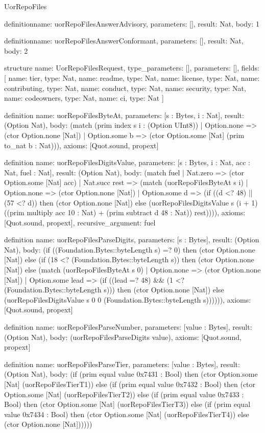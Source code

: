 \begin{lexlean}{UorRepoFiles}
\begin{semanticmodule}
definition{name: uorRepoFilesAnswerAdvisory, parameters: [], result: Nat, body: 1}

definition{name: uorRepoFilesAnswerConformant, parameters: [], result: Nat, body: 2}

structure{
  name: UorRepoFilesRequest,
  type_parameters: [],
  parameters: [],
  fields: [
    {name: tier, type: Nat},
    {name: readme, type: Nat},
    {name: license, type: Nat},
    {name: contributing, type: Nat},
    {name: conduct, type: Nat},
    {name: security, type: Nat},
    {name: codeowners, type: Nat},
    {name: ci, type: Nat}
  ]
}

definition{
  name: uorRepoFilesByteAt,
  parameters: [s : Bytes, i : Nat],
  result: (Option Nat),
  body: (match (prim index s i : (Option UInt8))
    | Option.none => (ctor Option.none [Nat])
    | Option.some b => (ctor Option.some [Nat] (prim to_nat b : Nat))),
  axioms: [Quot.sound, propext]
}

definition{
  name: uorRepoFilesDigitsValue,
  parameters: [s : Bytes, i : Nat, acc : Nat, fuel : Nat],
  result: (Option Nat),
  body: (match fuel
    | Nat.zero => (ctor Option.some [Nat] acc)
    | Nat.succ rest => (match (uorRepoFilesByteAt s i)
      | Option.none => (ctor Option.none [Nat])
      | Option.some d => (if ((d <? 48) || (57 <? d)) then (ctor Option.none [Nat]) else (uorRepoFilesDigitsValue s (i + 1) ((prim multiply acc 10 : Nat) + (prim subtract d 48 : Nat)) rest)))),
  axioms: [Quot.sound, propext],
  recursive_argument: fuel
}

definition{
  name: uorRepoFilesParseDigits,
  parameters: [s : Bytes],
  result: (Option Nat),
  body: (if ((Foundation.Bytes::byteLength s) =? 0) then (ctor Option.none [Nat]) else (if (18 <? (Foundation.Bytes::byteLength s)) then (ctor Option.none [Nat]) else (match (uorRepoFilesByteAt s 0)
    | Option.none => (ctor Option.none [Nat])
    | Option.some lead => (if ((lead =? 48) && (1 <? (Foundation.Bytes::byteLength s))) then (ctor Option.none [Nat]) else (uorRepoFilesDigitsValue s 0 0 (Foundation.Bytes::byteLength s)))))),
  axioms: [Quot.sound, propext]
}

definition{
  name: uorRepoFilesParseNumber,
  parameters: [value : Bytes],
  result: (Option Nat),
  body: (uorRepoFilesParseDigits value),
  axioms: [Quot.sound, propext]
}

definition{
  name: uorRepoFilesParseTier,
  parameters: [value : Bytes],
  result: (Option Nat),
  body: (if (prim equal value 0x7431 : Bool) then (ctor Option.some [Nat] (uorRepoFilesTierT1)) else (if (prim equal value 0x7432 : Bool) then (ctor Option.some [Nat] (uorRepoFilesTierT2)) else (if (prim equal value 0x7433 : Bool) then (ctor Option.some [Nat] (uorRepoFilesTierT3)) else (if (prim equal value 0x7434 : Bool) then (ctor Option.some [Nat] (uorRepoFilesTierT4)) else (ctor Option.none [Nat])))))
}


\end{semanticmodule}
\end{lexlean}
